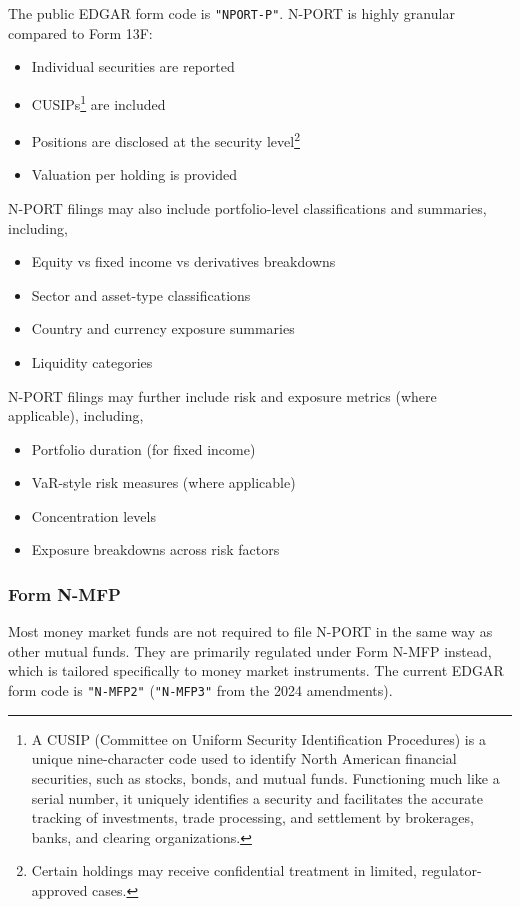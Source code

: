 \documentclass[11pt,a4paper]{report}
\begin{document}
The public EDGAR form code is \texttt{"NPORT-P"}. N-PORT is highly granular compared to Form 13F:
\begin{itemize}
  \item Individual securities are reported
  \item CUSIPs\footnote{A CUSIP (Committee on Uniform Security Identification Procedures) is a unique nine-character code used to identify North American financial securities, such as stocks, bonds, and mutual funds. Functioning much like a serial number, it uniquely identifies a security and facilitates the accurate tracking of investments, trade processing, and settlement by brokerages, banks, and clearing organizations.} are included
  \item Positions are disclosed at the security level\footnote{Certain holdings may receive confidential treatment in limited, regulator-approved cases.}
  \item Valuation per holding is provided
\end{itemize}

\noindent N-PORT filings may also include portfolio-level classifications and summaries, including,
\begin{itemize}
  \item Equity vs fixed income vs derivatives breakdowns
  \item Sector and asset-type classifications
  \item Country and currency exposure summaries
  \item Liquidity categories
\end{itemize}

\noindent N-PORT filings may further include risk and exposure metrics (where applicable), including,
\begin{itemize}
  \item Portfolio duration (for fixed income)
  \item VaR-style risk measures (where applicable)
  \item Concentration levels
  \item Exposure breakdowns across risk factors
\end{itemize}

\subsubsection{Form N-MFP}\label{N-MFP}
Most money market funds are not required to file N-PORT in the same way as other mutual funds. They are primarily regulated under Form N-MFP instead, which is tailored specifically to money market instruments. The current EDGAR form code is \texttt{"N-MFP2"} (\texttt{"N-MFP3"} from the 2024 amendments).
\end{document}
